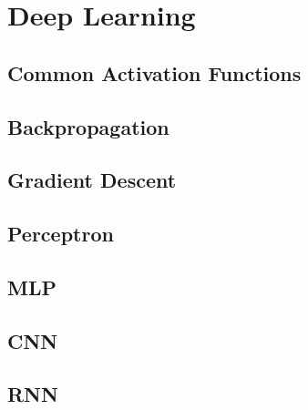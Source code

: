 \documentclass[18pt,a3paper,landscape, ncols=3]{cheatsheet}
\begin{document}
\section{Deep Learning} \seperator
	\subsection{Common Activation Functions}
		\begin{mdframed}
			\vspace{20mm}
		\end{mdframed}
	\subsection{Backpropagation}
		\begin{mdframed}
			\vspace{35mm}
		\end{mdframed}
	\subsection{Gradient Descent}
		\begin{mdframed}
			\vspace{35mm}
		\end{mdframed}
	\subsection{Perceptron}
		\begin{mdframed}
			\vspace{15mm}
		\end{mdframed}
	\subsection{MLP}
		\begin{mdframed}
			\vspace{15mm}
		\end{mdframed}
	\subsection{CNN}
		\begin{mdframed}
			\vspace{15mm}
		\end{mdframed}
	\subsection{RNN}
		\begin{mdframed}
			\vspace{15mm}
		\end{mdframed}
\end{document}
